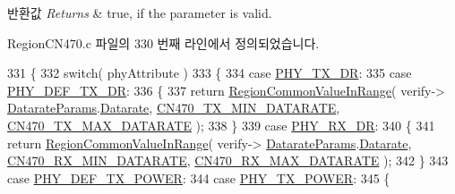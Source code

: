 \begin{DoxyRetVals}{반환값}
{\em Returns} & true, if the parameter is valid. \\
\hline
\end{DoxyRetVals}


Region\+C\+N470.\+c 파일의 330 번째 라인에서 정의되었습니다.


\begin{DoxyCode}
331 \{
332     \textcolor{keywordflow}{switch}( phyAttribute )
333     \{
334         \textcolor{keywordflow}{case} \mbox{\hyperlink{group___r_e_g_i_o_n_gga51cbe8f5433d914fe9cf81b451de2c2da62c19af9dc2c54540562e1158c015f57}{PHY\_TX\_DR}}:
335         \textcolor{keywordflow}{case} \mbox{\hyperlink{group___r_e_g_i_o_n_gga51cbe8f5433d914fe9cf81b451de2c2da70c3923333165960549162e3dcf10467}{PHY\_DEF\_TX\_DR}}:
336         \{
337             \textcolor{keywordflow}{return} \mbox{\hyperlink{group___r_e_g_i_o_n_c_o_m_m_o_n_gafdd1c80d953e18d755a631b72a9c3bd3}{RegionCommonValueInRange}}( verify->
      \mbox{\hyperlink{unionu_verify_params_a92427be16343eb3d9c14334eb95ec058}{DatarateParams}}.\mbox{\hyperlink{structu_verify_params_1_1s_datarate_params_ae2f6080f3aa0e9485c55513ca56bb24d}{Datarate}}, \mbox{\hyperlink{group___r_e_g_i_o_n_c_n470_gafc089f5bdc4ad69267f562d1fda11f79}{CN470\_TX\_MIN\_DATARATE}}, 
      \mbox{\hyperlink{group___r_e_g_i_o_n_c_n470_ga6124e3e1f145254943806b46c8844c1e}{CN470\_TX\_MAX\_DATARATE}} );
338         \}
339         \textcolor{keywordflow}{case} \mbox{\hyperlink{group___r_e_g_i_o_n_gga51cbe8f5433d914fe9cf81b451de2c2da8cc3b895173b07ee71127e366c8d0d55}{PHY\_RX\_DR}}:
340         \{
341             \textcolor{keywordflow}{return} \mbox{\hyperlink{group___r_e_g_i_o_n_c_o_m_m_o_n_gafdd1c80d953e18d755a631b72a9c3bd3}{RegionCommonValueInRange}}( verify->
      \mbox{\hyperlink{unionu_verify_params_a92427be16343eb3d9c14334eb95ec058}{DatarateParams}}.\mbox{\hyperlink{structu_verify_params_1_1s_datarate_params_ae2f6080f3aa0e9485c55513ca56bb24d}{Datarate}}, \mbox{\hyperlink{group___r_e_g_i_o_n_c_n470_ga5aa969a4651406bcd74903035a8cfc4f}{CN470\_RX\_MIN\_DATARATE}}, 
      \mbox{\hyperlink{group___r_e_g_i_o_n_c_n470_ga32c6368247a51d46cc53dfe9ea8c1d39}{CN470\_RX\_MAX\_DATARATE}} );
342         \}
343         \textcolor{keywordflow}{case} \mbox{\hyperlink{group___r_e_g_i_o_n_gga51cbe8f5433d914fe9cf81b451de2c2da18ae0d314f20c212f9e40207099ab1bb}{PHY\_DEF\_TX\_POWER}}:
344         \textcolor{keywordflow}{case} \mbox{\hyperlink{group___r_e_g_i_o_n_gga51cbe8f5433d914fe9cf81b451de2c2da0dceb30b79f1bae301afd5406a86d6f3}{PHY\_TX\_POWER}}:
345         \{

\end{DoxyCode}
